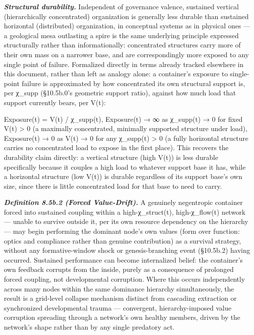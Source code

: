 \documentclass[
]{article}
\begin{document}
\emph{\textbf{Structural durability.}} Independent of governance
valence, sustained vertical (hierarchically concentrated) organization
is generally less durable than sustained horizontal (distributed)
organization, in conceptual systems as in physical ones --- a geological
mesa outlasting a spire is the same underlying principle expressed
structurally rather than informationally: concentrated structures carry
more of their own mass on a narrower base, and are correspondingly more
exposed to any single point of failure. Formalized directly in terms
already tracked elsewhere in this document, rather than left as analogy
alone: a container's exposure to single-point failure is approximated by
how concentrated its own structural support is, per χ\_supp (§10.5b.0's
geometric support ratio), against how much load that support currently
bears, per V(t):

Exposure(t) = V(t) / χ\_supp(t), Exposure(t) → ∞ as χ\_supp(t) → 0 for
fixed V(t) \textgreater{} 0 (a maximally concentrated, minimally
supported structure under load), Exposure(t) → 0 as V(t) → 0 for any
χ\_supp(t) \textgreater{} 0 (a fully horizontal structure carries no
concentrated load to expose in the first place). This recovers the
durability claim directly: a vertical structure (high V(t)) is less
durable specifically because it couples a high load to whatever support
base it has, while a horizontal structure (low V(t)) is durable
regardless of its support base's own size, since there is little
concentrated load for that base to need to carry.

\emph{\textbf{Definition 8.5b.2 (Forced Value-Drift).}} A genuinely
negentropic container forced into sustained coupling within a
high-χ\_struct(t), high-χ\_flow(t) network --- unable to survive outside
it, per its own resource dependency on the hierarchy --- may begin
performing the dominant node's own values (form over function: optics
and compliance rather than genuine contribution) as a survival strategy,
without any formative-window shock or genesis-branching event (§10.5b.2)
having occurred. Sustained performance can become internalized belief:
the container's own feedback corrupts from the inside, purely as a
consequence of prolonged forced coupling, not developmental corruption.
Where this occurs independently across many nodes within the same
dominance hierarchy simultaneously, the result is a grid-level collapse
mechanism distinct from cascading extraction or synchronized
developmental trauma --- convergent, hierarchy-imposed value corruption
spreading through a network's own healthy members, driven by the
network's shape rather than by any single predatory act.
\end{document}
